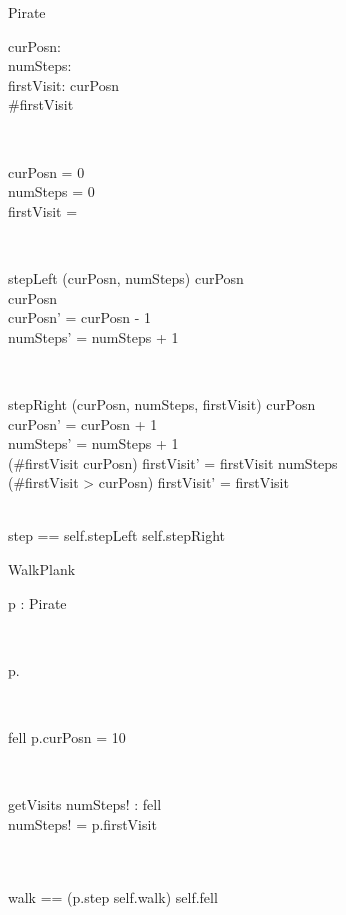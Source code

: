 \documentclass[11pt,a4paper]{article}
\begin{document}
\begin{class}{Pirate}
\also
	\begin{state}
		curPosn: \nat \\
		numSteps: \nat \\
		firstVisit: \seq \nat
	\where
		curPosn  \\
		\#firstVisit 
	\end{state} \\
	\begin{init}
		curPosn = 0 \\
		numSteps = 0 \\
		firstVisit = \langle \rangle
	\end{init} \\
	\begin{op}{stepLeft}
		\Delta (curPosn, numSteps)
	\where	
	        curPosn  \\
		curPosn \neq 10 \\
		curPosn' = curPosn - 1 \\
		numSteps' = numSteps + 1 \\
	\end{op} \\
	\begin{op}{stepRight}
		\Delta (curPosn, numSteps, firstVisit)
	\where
	        curPosn  \\
        	curPosn' = curPosn + 1 \\
	        numSteps' = numSteps + 1 \\
		(\#firstVisit \leq curPosn) \implies firstVisit' = firstVisit \cat
			\langle numSteps \rangle \\
		(\#firstVisit > curPosn) \implies firstVisit' = firstVisit
	\end{op} \\
	step == self.stepLeft \gch self.stepRight
	\end{class}

\begin{class}{WalkPlank}
\also
        \begin{state}
                p : Pirate
        \end{state} \\
	\begin{init}
		p.\Init
	\end{init}\\
	\begin{op}{fell}
        \where
		p.curPosn = 10
	\end{op} \\
	\begin{op}{getVisits}
		numSteps! : \seq \nat
	\where
		fell \\
		numSteps! = p.firstVisit
	\end{op} \\
	\\
        walk == (p.step \semi self.walk) \gch self.fell
\end{class}
\end{document}
